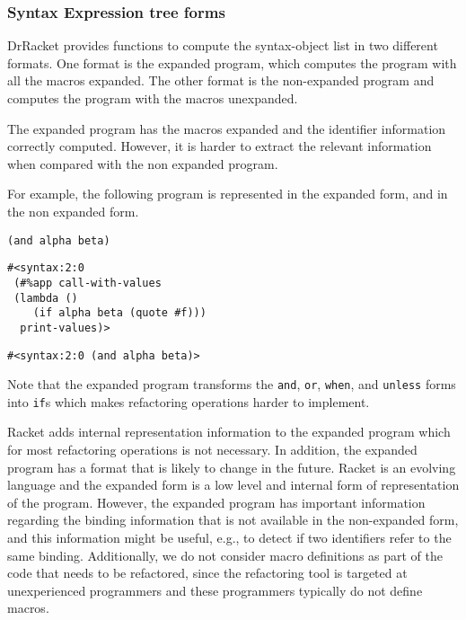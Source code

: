 \subsubsection{Syntax Expression tree forms}
DrRacket provides functions to compute the syntax-object list in two
different formats.  One format is the expanded program, which computes
the program with all the macros expanded.  The other format is the
non-expanded program and computes the program with the macros
unexpanded.

The expanded program has the macros expanded and the identifier
information correctly computed.  However, it is harder to extract the
relevant information when compared with the non expanded program.

For example, the following program is represented in the expanded
form, and in the non expanded form.

\begin{lstlisting}[basicstyle=\ttfamily, caption=Original Code]
(and alpha beta)
\end{lstlisting}

\begin{lstlisting}[basicstyle=\ttfamily, caption=Expanded program]
#<syntax:2:0
 (#%app call-with-values
 (lambda ()
    (if alpha beta (quote #f)))
  print-values)>
\end{lstlisting}

\begin{lstlisting}[basicstyle=\ttfamily, caption=Non-expanded program]
#<syntax:2:0 (and alpha beta)>
\end{lstlisting}

Note that the expanded program transforms the {\tt and}, {\tt or},
{\tt when}, and {\tt unless} forms into {\tt if}s which makes
refactoring operations harder to implement.

Racket adds internal representation information to the expanded
program which for most refactoring operations is not necessary.  In
addition, the expanded program has a format that is likely to change
in the future.  Racket is an evolving language and the expanded form
is a low level and internal form of representation of the program.
However, the expanded program has important information regarding the
binding information that is not available in the non-expanded form,
and this information might be useful, e.g., to detect if two
identifiers refer to the same binding.  Additionally, we do not
consider macro definitions as part of the code that needs to be
refactored, since the refactoring tool is targeted at unexperienced
programmers and these programmers typically do not define macros.

